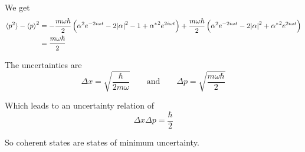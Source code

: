 \documentclass[a4paper,german,12pt,smallheadings]{scrartcl}
\begin{document}
\begin{enumerate}[a)]
    We get
    \begin{align*}
      \braket{p^2} - \braket{p}^2 &= 
                   - \frac{m \omega \hbar}{2} \del{\alpha^2 e^{-2i \omega t} - 2\envert{\alpha}^2 - 1 + {\alpha^*}^2 e^{2 i \omega t}}
                   + \frac{m \omega \hbar}{2} \del{\alpha^2 e^{-2i \omega t} - 2\envert{\alpha}^2 + {\alpha^*}^2 e^{2 i \omega t}} \\
                   &= \frac{m \omega \hbar}{2}
    \end{align*}

    The uncertainties are
    \begin{equation*}
      \Delta x = \sqrt{\frac{\hbar}{2 m \omega}} 
      \qquad \text{and} \qquad 
      \Delta p = \sqrt{\frac{m \omega \hbar}{2}}
    \end{equation*}

    Which leads to an uncertainty relation of
    \begin{equation*}
      \Delta x \Delta p = \frac{\hbar}{2}
    \end{equation*}

    So coherent states are states of minimum uncertainty.

\end{enumerate}
\end{document}
